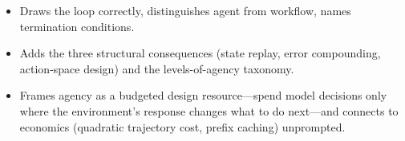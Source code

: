 \begin{interviewq}

\goodgreat
\begin{itemize}
    \item {} Draws the loop correctly, distinguishes agent from workflow, names termination conditions.
    \item {} Adds the three structural consequences (state replay, error compounding, action-space design) and the levels-of-agency taxonomy.
    \item {} Frames agency as a budgeted design resource---spend model decisions only where the environment's response changes what to do next---and connects to economics (quadratic trajectory cost, prefix caching) unprompted.
\end{itemize}

\end{interviewq}


